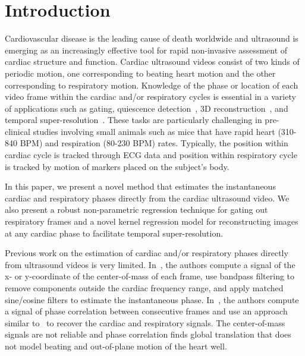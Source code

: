 \documentclass[runningheads,a4paper]{llncs}
\begin{document}
\section{Introduction}
\label{sec:intro}
%
Cardiovascular disease is the leading cause of death worldwide and ultrasound is emerging as an increasingly effective tool for rapid non-invasive assessment of cardiac structure and function. Cardiac ultrasound videos consist of two kinds of periodic motion, one corresponding to beating heart motion and the other corresponding to respiratory motion. Knowledge of the phase or location of each video frame within the cardiac and/or respiratory cycles is essential in a variety of applications such as gating\cite{VonBirgelen1997}, quiescence detection~\cite{Wick2013}, 3D reconstruction~\cite{Wachinger2012}, and temporal super-resolution~\cite{Cherin2006}. These tasks are particularly challenging in pre-clinical studies involving small animals such as mice that have rapid heart (310-840 BPM) and respiration (80-230 BPM) rates. Typically, the position within cardiac cycle is tracked through ECG data and position within respiratory cycle is tracked by motion of markers placed on the subject's body\cite{Khamene2004}. 

	In this paper, we present a novel method that estimates the instantaneous cardiac and respiratory phases directly from the cardiac ultrasound video. We also present a robust non-parametric regression technique for gating out respiratory frames and a novel kernel regression model for reconstructing images at any cardiac phase to facilitate temporal super-resolution. 
	
	Previous work on the estimation of cardiac and/or respiratory phases directly from ultrasound videos is very limited. In~\cite{Karadayi2006}, the authors compute a signal of the x- or y-coordinate of the center-of-mass of each frame, use bandpass filtering to remove components outside the cardiac frequency range, and apply matched sine/cosine filters to estimate the instantaneous phase. In~\cite{Sundar2009}, the authors compute a signal of phase correlation between consecutive frames and use an approach similar to~\cite{Karadayi2006} to recover the cardiac and respiratory signals. The center-of-mass signals are not reliable and phase correlation finds global translation that does not model beating and out-of-plane motion of the heart well.
%
\vspace{-0.9cm}
\end{document}

